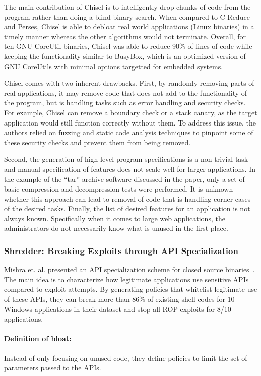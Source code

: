 The main contribution of Chisel is to intelligently drop chunks of code from the program rather than doing a blind binary search. When compared to C-Reduce and Perses, Chisel is able to debloat real world applications (Linux binaries) in a timely manner whereas the other algorithms would not terminate. Overall, for ten GNU CoreUtil binaries, Chisel was able to reduce 90\% of lines of code while keeping the functionality similar to BusyBox, which is an optimized version of GNU CoreUtils with minimal options targetted for embedded systems.

Chisel comes with two inherent drawbacks. First, by randomly removing parts of real applications, it may remove code that does not add to the functionality of the program, but is handling tasks such as error handling and security checks.
For example, Chisel can remove a boundary check or a stack canary, as the target application would still function correctly without them. To address this issue, the authors relied on fuzzing and static code analysis techniques to pinpoint some of these
security checks and prevent them from being removed.

Second, the generation of high level program specifications is a non-trivial task and manual specification of features does not scale well for larger applications. In the example of the ``tar'' archive software discussed in the paper, only a set of basic compression and decompression tests were performed. It is unknown whether this approach can lead to removal of code that is handling corner cases of the desired tasks. Finally, the list of desired features for an application is not always known. Specifically when it comes to large web applications, the administrators do not necessarily know what is unused in the first place.

\subsubsection{Shredder: Breaking Exploits through API Specialization}
Mishra et. al. presented an API specialization scheme for closed source binaries~\cite{mishra2018shredder}. The main idea is to characterize how legitimate applications use sensitive APIs compared to exploit attempts. By generating policies that
whitelist legitimate use of these APIs, they can break more than 86\% of existing shell codes for 10 Windows applications in their dataset and stop all ROP exploits for 8/10 applications.

\paragraph{Definition of bloat:} Instead of only focusing on unused code, they define policies to limit the set of parameters passed to the APIs.
